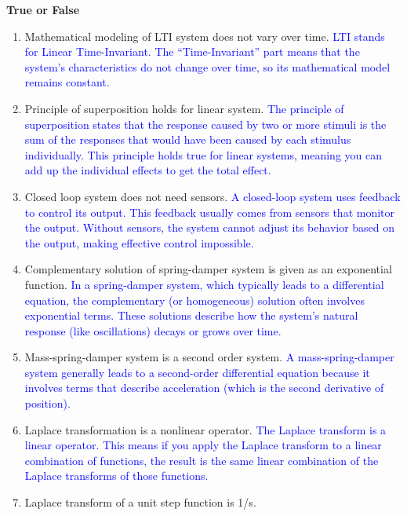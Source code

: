 \documentclass[12pt]{article}
\begin{document}
\textbf{True or False}
\begin{enumerate}
	\item Mathematical modeling of LTI system does not vary over time.\newline
	      \textcolor{blue}{LTI stands for Linear Time-Invariant. The ``Time-Invariant'' part means that the system's characteristics do not change over time, so its mathematical model remains constant.}
	\item Principle of superposition holds for linear system.\newline
	      \textcolor{blue}{The principle of superposition states that the response caused by two or more stimuli is the sum of the responses that would have been caused by each stimulus individually. This principle holds true for linear systems, meaning you can add up the individual effects to get the total effect.}
	\item Closed loop system does not need sensors.\newline
	      \textcolor{blue}{A closed-loop system uses feedback to control its output. This feedback usually comes from sensors that monitor the output. Without sensors, the system cannot adjust its behavior based on the output, making effective control impossible.}
	\item Complementary solution of spring-damper system is given as an exponential function.\newline
	      \textcolor{blue}{In a spring-damper system, which typically leads to a differential equation, the complementary (or homogeneous) solution often involves exponential terms. These solutions describe how the system's natural response (like oscillations) decays or grows over time.}
	\item Mass-spring-damper system is a second order system.\newline
	      \textcolor{blue}{A mass-spring-damper system generally leads to a second-order differential equation because it involves terms that describe acceleration (which is the second derivative of position).}
	\item Laplace transformation is a nonlinear operator.\newline
	      \textcolor{blue}{The Laplace transform is a linear operator. This means if you apply the Laplace transform to a linear combination of functions, the result is the same linear combination of the Laplace transforms of those functions.}
	\item Laplace transform of a unit step function is 1/s.\newline

\end{enumerate}
\end{document}
